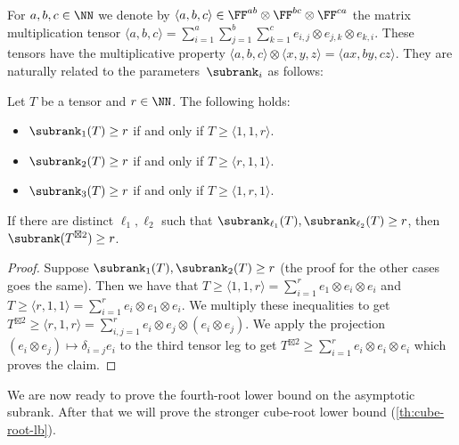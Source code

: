 For $a,b,c \in \NN$ we denote by $\langle a,b,c\rangle \in \FF^{ab} \otimes \FF^{bc} \otimes \FF^{ca}$ the %
matrix multiplication tensor $\langle a,b,c \rangle = \sum_{i=1}^a \sum_{j=1}^b \sum_{k=1}^c e_{i,j} \otimes e_{j,k} \otimes e_{k,i}$. 
These tensors have the multiplicative property $\langle a,b,c\rangle \otimes \langle x,y,z\rangle = \langle ax, by, cz\rangle$. They are naturally related to the parameters~$\subrank_i$ as follows:

\begin{lemma}\label{lem:Qi-mamu}
Let $T$ be a tensor and $r \in \NN$. The following holds:
\begin{itemize}
\item $\subrank_1(T) \geq r$ if and only if $T \geq \langle 1, 1,r \rangle$.
\item $\subrank_2(T) \geq r$ if and only if $T \geq \langle r, 1,1 \rangle$.
\item $\subrank_3(T) \geq r$ if and only if $T \geq \langle 1, r, 1 \rangle$.  
\end{itemize}
\end{lemma}

\begin{lemma}\label{lem:Qi-square}
    If there are distinct ${\ell_1},{\ell_2}$ such that $\subrank_{\ell_1}(T), \subrank_{\ell_2}(T) \geq r$, then $\subrank(T^{\boxtimes 2}) \geq r$.
\end{lemma}

\begin{proof}
Suppose $\subrank_1(T), \subrank_2(T) \geq r$ (the proof for the other cases goes the same). Then we have that
$
T \geq \langle1, 1, r\rangle =  \sum_{i=1}^r e_1 \otimes e_i \otimes e_i$ and 
$T \geq \langle r, 1, 1\rangle = \sum_{i=1}^r e_i \otimes e_1 \otimes e_i$.
%
We multiply these inequalities to get
$T^{\boxtimes 2} \geq \langle r,1,r\rangle= \sum_{i,j=1}^r e_i \otimes e_j \otimes (e_i \otimes e_j).
$
We apply the projection $(e_i \otimes e_j) \mapsto \delta_{i=j} e_i$ to the third tensor leg to get
$
T^{\boxtimes 2} \geq \sum_{i=1}^r e_i \otimes e_i \otimes e_i
$
which proves the claim.
\end{proof}

We are now ready to prove the fourth-root lower bound on the asymptotic subrank. After that we will prove the stronger cube-root lower bound (\autoref{th:cube-root-lb}).

